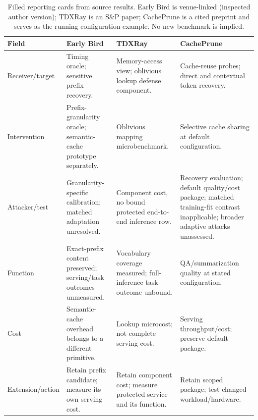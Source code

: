 \begin{table}[t]\centering\footnotesize
\caption{Filled reporting cards from source results. Early Bird is venue-linked (inspected author version); TDXRay is an S\&P paper; CachePrune is a cited preprint and serves as the running configuration example. No new benchmark is implied.}\label{tab:r33-filled}
\begin{tabularx}{\textwidth}{@{}p{}YYY@{}}\toprule
Field & Early Bird \cite[V-A--B]{earlybird2025} & TDXRay \cite[6.1, Fig.~8, Table~3]{hornetz2026tdxray} & CachePrune \cite[5.1--5.6]{wu2026cacheprune}\\\midrule
Receiver/target & Timing oracle; sensitive prefix recovery. & Memory-access view; oblivious lookup defense component. & Cache-reuse probes; direct and contextual token recovery.\\
Intervention & Prefix-granularity oracle; semantic-cache prototype separately. & Oblivious mapping microbenchmark. & Selective cache sharing at default configuration.\\
Attacker/test & Granularity-specific calibration; matched adaptation unresolved. & Component cost, no bound protected end-to-end inference row. & Recovery evaluation; default quality/cost package; matched training-fit contrast inapplicable; broader adaptive attacks unassessed.\\
Function & Exact-prefix content preserved; serving/task outcomes unmeasured. & Vocabulary coverage measured; full-inference task outcome unbound. & QA/summarization quality at stated configuration.\\
Cost & Semantic-cache overhead belongs to a different primitive. & Lookup microcost; not complete serving cost. & Serving throughput/cost; preserve default package.\\
Extension/action & Retain prefix candidate; measure its own serving cost. & Retain component cost; measure protected service and its function. & Retain scoped package; test changed workload/hardware.\\
\bottomrule\end{tabularx}\end{table}
